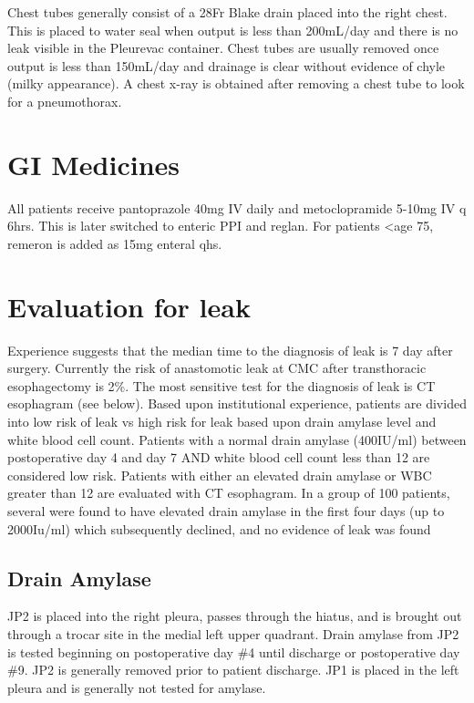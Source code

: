 \documentclass[
]{book}
\begin{document}
Chest tubes generally consist of a 28Fr Blake drain placed into the right chest. This is placed to water seal when output is less than 200mL/day and there is no leak visible in the Pleurevac container. Chest tubes are usually removed once output is less than 150mL/day and drainage is clear without evidence of chyle (milky appearance). A chest x-ray is obtained after removing a chest tube to look for a pneumothorax.

\hypertarget{gi-medicines}{%
\section{GI Medicines}\label{gi-medicines}}

All patients receive pantoprazole 40mg IV daily and metoclopramide 5-10mg IV q 6hrs. This is later switched to enteric PPI and reglan. For patients \textless age 75, remeron is added as 15mg enteral qhs.

\hypertarget{leak_evaluation}{%
\section{Evaluation for leak}\label{leak_evaluation}}

Experience suggests that the median time to the diagnosis of leak is 7 day after surgery. Currently the risk of anastomotic leak at CMC after transthoracic esophagectomy is 2\%. The most sensitive test for the diagnosis of leak is CT esophagram (see below). Based upon institutional experience, patients are divided into low risk of leak vs high risk for leak based upon drain amylase level and white blood cell count. Patients with a normal drain amylase (400IU/ml) between postoperative day 4 and day 7 AND white blood cell count less than 12 are considered low risk. Patients with either an elevated drain amylase or WBC greater than 12 are evaluated with CT esophagram. In a group of 100 patients, several were found to have elevated drain amylase in the first four days (up to 2000Iu/ml) which subsequently declined, and no evidence of leak was found

\hypertarget{drain_amylase}{%
\subsection{Drain Amylase}\label{drain_amylase}}

JP2 is placed into the right pleura, passes through the hiatus, and is brought out through a trocar site in the medial left upper quadrant. Drain amylase from JP2 is tested beginning on postoperative day \#4 until discharge or postoperative day \#9. JP2 is generally removed prior to patient discharge. JP1 is placed in the left pleura and is generally not tested for amylase.
\end{document}
